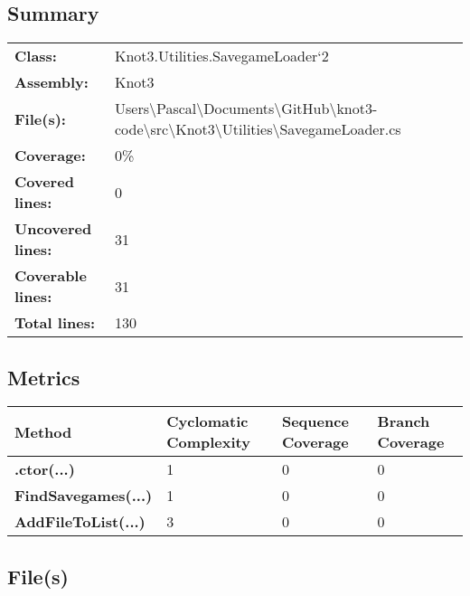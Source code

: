 \documentclass[a4paper,10pt]{article}
\begin{document}
\subsection{Summary}
\begin{longtable}[l]{ll}
\textbf{Class:} & Knot3.Utilities.SavegameLoader`2\\
\textbf{Assembly:} & Knot3\\
\textbf{File(s):} & \begin{minipage}[t]{12cm}{Users\textbackslash Pascal\textbackslash Documents\textbackslash GitHub\textbackslash knot3-code\textbackslash src\textbackslash Knot3\textbackslash Utilities\textbackslash SavegameLoader.cs}\end{minipage} \\
\textbf{Coverage:} & 0\%\\
\textbf{Covered lines:} & 0\\
\textbf{Uncovered lines:} & 31\\
\textbf{Coverable lines:} & 31\\
\textbf{Total lines:} & 130\\
\end{longtable}
\subsection{Metrics}
\begin{longtable}[l]{|l|l|l|l|}
\hline
\textbf{Method} & \textbf{Cyclomatic Complexity} & \textbf{Sequence Coverage} & \textbf{Branch Coverage}\\
\hline
\textbf{.ctor(...)} & 1 & 0 & 0\\
\hline
\textbf{FindSavegames(...)} & 1 & 0 & 0\\
\hline
\textbf{AddFileToList(...)} & 3 & 0 & 0\\
\hline
\end{longtable}
\subsection{File(s)}
\end{document}
